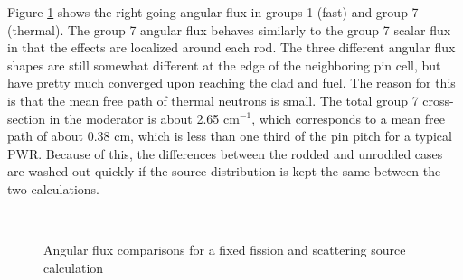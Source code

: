 Figure \ref{f:1dmoc-fixed-50-angflux} shows the right-going angular flux in groups 1 (fast) and group 7 (thermal).  The group 7 angular flux behaves similarly to the group 7 scalar flux in that the effects are localized around each rod.  The three different angular flux shapes are still somewhat different at the edge of the neighboring pin cell, but have pretty much converged upon reaching the clad and fuel.  The reason for this is that the mean free path of thermal neutrons is small.  The total group 7 cross-section in the moderator is about 2.65 cm$^{-1}$, which corresponds to a mean free path of about 0.38 cm, which is less than one third of the pin pitch for a typical PWR.  Because of this, the differences between the rodded and unrodded cases are washed out quickly if the source distribution is kept the same between the two calculations.

\begin{figure}[H]
  \centering
  ~
  \caption{Angular flux comparisons for a fixed fission and scattering source calculation}\label{f:1dmoc-fixed-50-angflux}
\end{figure}

